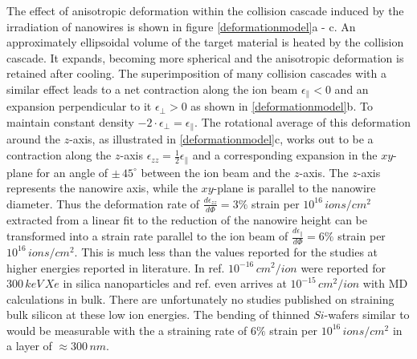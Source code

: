 The effect of anisotropic deformation within the collision cascade induced by the irradiation of nanowires is shown in figure \ref{deformationmodel}a - c. An approximately ellipsoidal volume of the target material is heated by the collision cascade. It expands, becoming more spherical and the anisotropic deformation is retained after cooling. The superimposition of many collision cascades with a similar effect leads to a net contraction along the ion beam $\epsilon_{\parallel} < 0$ and an expansion perpendicular to it $\epsilon_{\perp} > 0$ as shown in \ref{deformationmodel}b. To maintain constant density $-2\cdot\epsilon_{\perp} =  \epsilon_{\parallel}$. The rotational average of this deformation around the $z$-axis, as illustrated in \ref{deformationmodel}c, works out to be a contraction along the $z$-axis $\epsilon_{zz} = \frac{1}{2} \epsilon_{\parallel}$ and a corresponding expansion in the $xy$-plane for an angle of $\pm\, 45^\circ$ between the ion beam and the $z$-axis. The $z$-axis represents the nanowire axis, while the $xy$-plane is parallel to the nanowire diameter. Thus the deformation rate of $\frac{d\epsilon_{zz}}{d\Phi} = 3\%$ strain per $10^{16}\,ions/cm^2$ extracted from a linear fit to the reduction of the nanowire height can be transformed into a strain rate parallel to the ion beam of $\frac{d\epsilon_{\parallel}}{d\Phi} = 6\%$ strain per $10^{16}\,ions/cm^2$. This is much less than the values reported for the studies at higher energies reported in literature. In ref. \cite{dillen_ion_2003} $10^{-16}\,cm^2/ion$ were reported for $300\,keV\,Xe$ in silica nanoparticles and ref. \cite{baumer_prediction_2014} even arrives at $10^{-15}\,cm^2/ion$ with MD calculations in bulk. There are unfortunately no studies published on straining bulk silicon at these low ion energies. The bending of thinned $Si$-wafers similar to \cite{volkert_stress_1991,massl_stress_2008} would be measurable with the a straining rate of $6\%$ strain per $10^{16}\,ions/cm^2$ in a layer of $\approx 300\,nm$.

